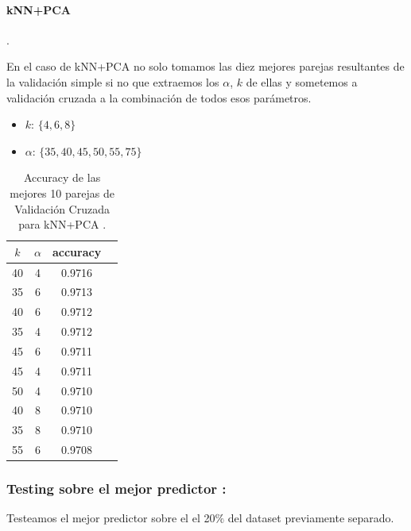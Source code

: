 \paragraph{kNN+PCA}.

En el caso de kNN+PCA  no solo tomamos las diez mejores parejas resultantes de la validación simple si no que extraemos los $\alpha$, $k$ de ellas y sometemos a validación cruzada a la combinación de todos esos parámetros.

\begin{itemize}
    \item \textbf{$k$}: $ \{4,6,8\}$
    \item \textbf{$\alpha$}: $\{  35, 40, 45, 50, 55, 75 \}$
\end{itemize}

\begin{table}[h!]
    \begin{center}
        \begin{tabular}{|c|c|c|c|}
        \hline
        \textbf{$k$} & \textbf{$\alpha$} & \textbf{accuracy} \\
        \hline
        40 & 4 & 0.9716\\
        35 & 6 & 0.9713\\
        40 & 6 & 0.9712\\
        35 & 4 & 0.9712\\
        45 & 6 & 0.9711\\
        45 & 4 & 0.9711\\
        50 & 4 & 0.9710\\
        40 & 8 & 0.9710\\
        35 & 8 & 0.9710\\
        55 & 6 & 0.9708\\
        
        \hline
        \end{tabular}
        \caption{Accuracy de las mejores 10 parejas de Validación Cruzada para kNN+PCA .}
        \label{knnpca_crossVal_table}

    \end{center}
\end{table}

\subsubsection{ Testing sobre el mejor predictor : }

Testeamos el mejor predictor sobre el el 20$\%$ del dataset previamente separado.
